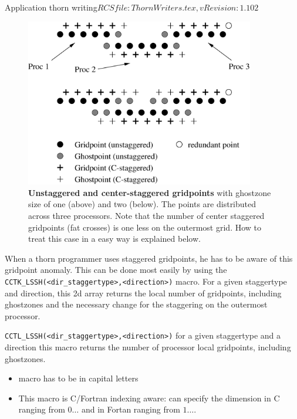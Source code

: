 \begin{cactuspart}{2}{Application thorn writing}{$RCSfile: ThornWriters.tex,v $}{$Revision: 1.102 $}
\begin{figure}[ht]
  \def\epsfsize#1#2{0.45#1}
\begin{center}
\ifpdf
\else
\includegraphics[angle=0,width=10cm]{staggering2.eps}
\fi
\end{center}
\caption[]{\small {\bf Unstaggered and center-staggered gridpoints} with
ghostzone size of one (above) and two (below). The points are
distributed across three processors. Note that the number of
center staggered gridpoints (fat crosses) is one less on the outermost grid. How to
treat this case in a easy way is explained below. }
\label{fig:stagger2}
\end{figure}

When a thorn programmer uses staggered gridpoints, he has to be aware
of this gridpoint anomaly. This can be done most easily by using the {\tt
CCTK\_LSSH(<dir\_staggertype>,<direction>)} macro. For a given staggertype
and direction, this 2d array returns the local number of gridpoints,
including  ghostzones and the necessary change for the staggering on
the outermost processor.

\begin{Lentry}
\item[{\tt CCTL\_LSSH(<dir\_staggertype>,<direction>)}]
for a given staggertype and a direction this macro returns the number
of processor local gridpoints, including ghostzones.

\begin{itemize}
\item{macro has to be in capital letters}
\item{This macro is C/Fortran indexing aware:
can specify the dimension in C ranging from $0 \ldots$ and in Fortan
ranging from $1 \ldots$.}
\end{itemize}
\end{Lentry}


\end{cactuspart}
